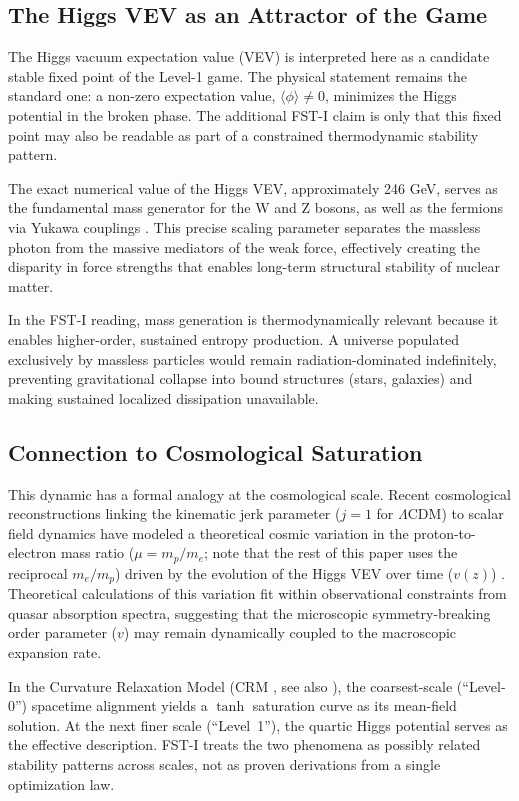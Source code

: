 \documentclass[12pt,a4paper]{article}
\theoremstyle{remark}
\begin{document}
\subsection{The Higgs VEV as an Attractor of the Game}

The Higgs vacuum expectation value (VEV) is interpreted here as a candidate stable fixed point of the Level-1 game. The physical statement remains the standard one: a non-zero expectation value, $\langle\phi\rangle \neq 0$, minimizes the Higgs potential in the broken phase. The additional FST-I claim is only that this fixed point may also be readable as part of a constrained thermodynamic stability pattern.

The exact numerical value of the Higgs VEV, approximately 246 GeV, serves as the fundamental mass generator for the W and Z bosons, as well as the fermions via Yukawa couplings \citep{HiggsVEV}. This precise scaling parameter separates the massless photon from the massive mediators of the weak force, effectively creating the disparity in force strengths that enables long-term structural stability of nuclear matter.

In the FST-I reading, mass generation is thermodynamically relevant because it enables higher-order, sustained entropy production. A universe populated exclusively by massless particles would remain radiation-dominated indefinitely, preventing gravitational collapse into bound structures (stars, galaxies) and making sustained localized dissipation unavailable.

\subsection{Connection to Cosmological Saturation}

This dynamic has a formal analogy at the cosmological scale. Recent cosmological reconstructions linking the kinematic jerk parameter ($j = 1$ for $\Lambda$CDM) to scalar field dynamics have modeled a theoretical cosmic variation in the proton-to-electron mass ratio ($\mu = m_p/m_e$; note that the rest of this paper uses the reciprocal $m_e/m_p$) driven by the evolution of the Higgs VEV over time ($v(z)$) \citep{HiggsVEV2024}. Theoretical calculations of this variation fit within observational constraints from quasar absorption spectra, suggesting that the microscopic symmetry-breaking order parameter ($v$) may remain dynamically coupled to the macroscopic expansion rate.

In the Curvature Relaxation Model (CRM \cite{GeigerCRM2026}, see also \cite{FST-Unified2026}), the coarsest-scale (``Level-0'') spacetime alignment yields a $\tanh$ saturation curve as its mean-field solution. At the next finer scale (``Level~1''), the quartic Higgs potential serves as the effective description. FST-I treats the two phenomena as possibly related stability patterns across scales, not as proven derivations from a single optimization law.
\end{document}
